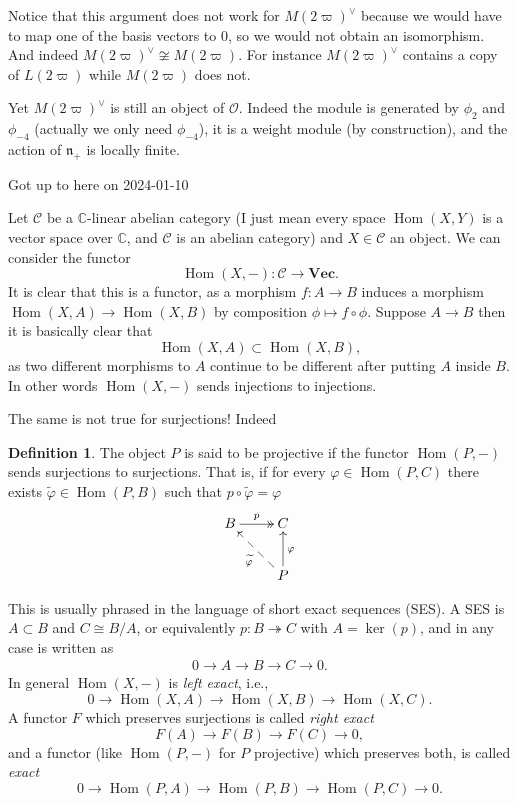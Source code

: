 \documentclass[12pt]{article}
\theoremstyle{plain}
\theoremstyle{definition}
\newtheorem{defn}{Definition}[section]
\numberwithin{equation}{section}
\DeclareMathOperator{\Hom}{Hom}
\newcommand{\wtil}[1]{\widetilde{#1}}
\newcommand{\C}{\mathbb{C}}
\newcommand{\n}{\mathfrak{n}}
\newcommand{\CC}{\mathcal{C}}
\newcommand{\OO}{\mathcal{O}}
\newcommand{\Vect}{\mathbf{Vec}}
\begin{document}
Notice that this argument does not work for $M(2\varpi)^\vee$ because we would have to map one of the basis vectors to $0$, so we would not obtain an isomorphism. And indeed $M(2\varpi)^\vee \not\cong M(2\varpi)$. For instance $M(2\varpi)^\vee$ contains a copy of $L(2\varpi)$ while $M(2\varpi)$ does not.

Yet $M(2\varpi)^\vee$ is still an object of $\OO$. Indeed the module is generated by $\phi_2$ and $\phi_{-4}$ (actually we only need $\phi_{-4}$), it is a weight module (by construction), and the action of $\n_+$ is locally finite.


{\color{red}Got up to here on 2024-01-10}

Let $\CC$ be a $\C$-linear abelian category (I just mean every space $\Hom(X, Y)$ is a vector space over $\C$, and $\CC$ is an abelian category) and $X \in \CC$ an object. We can consider the functor
\[
\Hom(X, -) : \CC \rightarrow \Vect.
\]
It is clear that this is a functor, as a morphism $f : A \rightarrow B$ induces a morphism $\Hom(X, A) \rightarrow \Hom(X, B)$ by composition $\phi \mapsto f \circ \phi$. Suppose $A \rightarrow B$ then it is basically clear that
\[
\Hom(X, A) \subset \Hom(X, B),
\]
as two different morphisms to $A$ continue to be different after putting $A$ inside $B$. In other words $\Hom(X, -)$ sends injections to injections.

The same is not true for surjections! Indeed
\begin{defn}
The object $P$ is said to be projective if the functor $\Hom(P, -)$ sends surjections to surjections. That is, if for every $\varphi \in \Hom(P, C)$ there exists $\wtil\varphi \in \Hom(P, B)$ such that $p \circ \wtil{\varphi} = \varphi$
\begin{align*}
\xymatrix{
B \ar@{->>}[r]^{p} & C \\
%
 & P \ar@{->}[u]_{\varphi} \ar@{-->}[ul]^{\wtil{\varphi}} \\
}
\end{align*}
\end{defn}
This is usually phrased in the language of short exact sequences (SES). A SES is $A \subset B$ and $C \cong B/A$, or equivalently $p : B \twoheadrightarrow C$ with $A = \ker(p)$, and in any case is written as
\begin{align}\label{eq:SES}
0 \rightarrow A \rightarrow B \rightarrow C \rightarrow 0.
\end{align}
In general $\Hom(X, -)$ is \emph{left exact}, i.e.,
\[
0 \rightarrow \Hom(X, A) \rightarrow \Hom(X, B) \rightarrow \Hom(X, C).
\]
A functor $F$ which preserves surjections is called \emph{right exact}
\[
F(A) \rightarrow F(B) \rightarrow F(C) \rightarrow 0,
\]
and a functor (like $\Hom(P, -)$ for $P$ projective) which preserves both, is called \emph{exact}
\[
0 \rightarrow \Hom(P, A) \rightarrow \Hom(P, B) \rightarrow \Hom(P, C) \rightarrow 0.
\]
\end{document}
